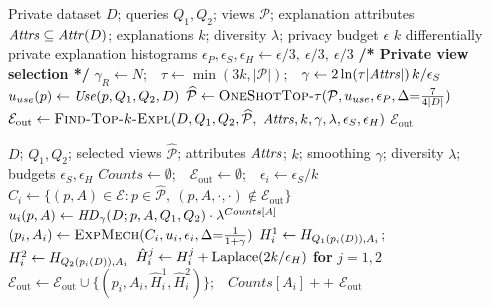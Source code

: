 \begin{algorithm}[t]
\caption{Private-Queries-Diff-Top-$k$-Explanation}
\label{alg:main}
\begin{algorithmic}[1]
\Require Private dataset $D$; queries $Q_1,Q_2$; views $\mathcal{P}$; explanation attributes $\mathit{Attrs}\subseteq\mathit{Attr}(D)$; explanations $k$; diversity $\lambda$; privacy budget $\epsilon$
\Ensure $k$ differentially private explanation histograms
\State $\epsilon_P,\epsilon_S,\epsilon_H \gets \epsilon/3,\ \epsilon/3,\ \epsilon/3$ 
\State \textbf{/* Private view selection */}
\State $\gamma_R\gets N$;\ \ $\tau\gets\min(3k,|\mathcal{P}|)$;\ \ $\gamma\gets 2\ln(\tau|\mathit{Attrs}|)\,k/\epsilon_S$
\State $u_{use}(p)\gets \mathit{Use}(p,Q_1,Q_2,D)$
\State $\widehat{\mathcal{P}}\gets \textsc{OneShotTop-}\tau(\mathcal{P},u_{use},\epsilon_P,\Delta{=}\tfrac{7}{4|D|})$
\State $\mathcal{E}_{\mathrm{out}}\gets \textsc{Find-Top-$k$-Expl}(D,Q_1,Q_2,\widehat{\mathcal{P}},$
\Statex \hspace{\algorithmicindent}$\mathit{Attrs},k,\gamma,\lambda,\epsilon_S,\epsilon_H)$
\State \Return $\mathcal{E}_{\mathrm{out}}$
\end{algorithmic}
\end{algorithm}


\begin{algorithm}[t]
\caption{Find-Top-$k$-Explanations}
\label{alg:topk}
\begin{algorithmic}[1]
\Require $D$; $Q_1,Q_2$; selected views $\widehat{\mathcal{P}}$; attributes $\mathit{Attrs}$; $k$; smoothing $\gamma$; diversity $\lambda$; budgets $\epsilon_S,\epsilon_H$
\State $Counts\gets\emptyset$;\ \ $\mathcal{E}_{\mathrm{out}}\gets\emptyset$;\ \ $\epsilon_i \gets \epsilon_S/k$
  \State $C_i \gets \{(p,A)\in\mathcal{E}: p\in\widehat{\mathcal{P}},\ (p,A,\cdot,\cdot)\notin\mathcal{E}_{\mathrm{out}}\}$
  \State $u_i(p,A)\gets \mathit{HD}_{\gamma}(D;p,A,Q_1,Q_2)\cdot \lambda^{Counts[A]}$
  \State $(p_i,A_i)\gets \textsc{ExpMech}(C_i,u_i,\epsilon_i,\Delta{=}\tfrac{1}{1+\gamma})$
  \State $H^1_i\gets H_{Q_1(p_i(D)),A_i}$;\ \ $H^2_i\gets H_{Q_2(p_i(D)),A_i}$
  \State $\hat H^j_i\gets H^j_i+\operatorname{Laplace}(2k/\epsilon_H)$ \textbf{for} $j=1,2$
  \State $\mathcal{E}_{\mathrm{out}}\gets\mathcal{E}_{\mathrm{out}}\cup\{(p_i,A_i,\hat H^1_i,\hat H^2_i)\}$;\ \ $Counts[A_i]{+}{+}$
\EndFor
\State \Return $\mathcal{E}_{\mathrm{out}}$
\end{algorithmic}
\end{algorithm}

